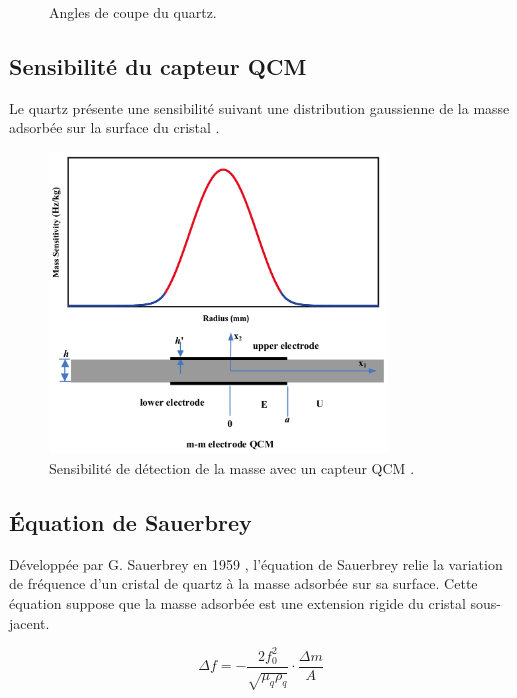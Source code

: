 \begin{figure}[H]
\begin{minipage}[t]{0.48\textwidth}
        \caption{Angles de coupe du quartz.}
        \label{fig:cut_angles}
    \end{minipage}
\end{figure}

\subsection{Sensibilité du capteur QCM}

Le quartz présente une sensibilité suivant une distribution gaussienne de la masse adsorbée sur la surface du cristal \cite{s22145112}.

\begin{figure}[H]
    \centering
    \includegraphics[width=0.8\textwidth]{assets/figures/MassSensitvity.png}
    \caption{Sensibilité de détection de la masse avec un capteur QCM \cite{Huang2022}.}
    \label{fig:mass_sensitivity}
\end{figure}

\subsection{Équation de Sauerbrey}

Développée par G. Sauerbrey en 1959 \cite{sauerbrey1959}, l’équation de Sauerbrey relie la variation de fréquence d’un cristal de quartz à la masse adsorbée sur sa surface.  
Cette équation suppose que la masse adsorbée est une extension rigide du cristal sous-jacent.

\begin{equation}
    \Delta f = -\frac{2f_0^2}{\sqrt{\mu_q \rho_q}} \cdot \frac{\Delta m}{A}
\end{equation}

